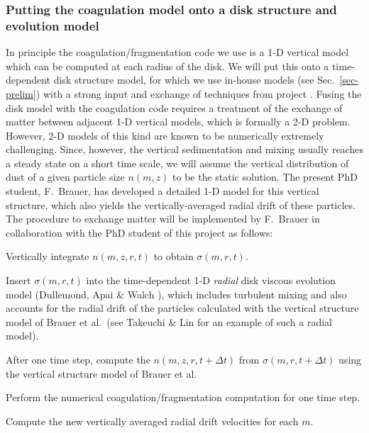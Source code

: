 \subsubsection{Putting the coagulation model onto a disk structure and evolution model}
In principle the coagulation/fragmentation code we use is a 1-D vertical
model which can be computed at each radius of the disk. We will put this
onto a time-dependent disk structure model, for which we use in-house
models (see Sec.~\ref{sec-prelim}) with a strong input and exchange of
techniques from project \projtscharn{}. Fusing the disk model with the
coagulation code requires a treatment of the exchange of matter
between adjacent 1-D vertical models, which is formally a 2-D problem.
However, 2-D models of this kind are known to be numerically extremely
challenging. Since, however, the vertical sedimentation and mixing usually
reaches a steady state on a short time scale, we will assume the vertical
distribution of dust of a given particle size $n(m,z)$ to be the static
solution. The present PhD student, F.~Brauer, has developed a detailed 1-D
model for this vertical structure, which also yields the vertically-averaged
radial drift of these particles. The procedure to exchange matter will be
implemented by F.~Brauer in collaboration with the PhD student of this
project as follows:
\begin{compactitemize}
\item Vertically integrate $n(m,z,r,t)$ to obtain $\sigma(m,r,t)$.
\item Insert $\sigma(m,r,t)$ into the time-dependent 1-D {\em radial} 
disk viscous evolution model (Dullemond, Apai \& Walch ), which
includes turbulent mixing and also accounts for the radial drift of the
particles calculated with the vertical structure model of Brauer et al.~(see
Takeuchi \& Lin  for an example of such a radial model).
\item After one time step, compute the $n(m,z,r,t+\Delta t)$ from
$\sigma(m,r,t+\Delta t)$ using the vertical structure model of
Brauer et al.
\item Perform the numerical coagulation/fragmentation computation for one
time step.
\item Compute the new vertically averaged radial drift velocities 
for each $m$.
\end{compactitemize}



